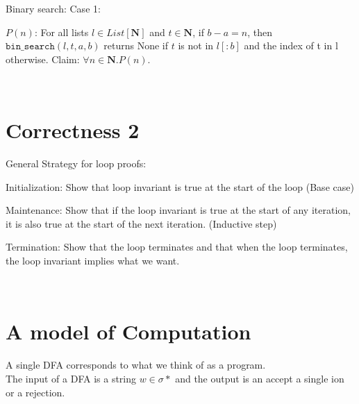 \documentclass{article}
\begin{document}
Binary search: Case 1: 

$P(n)$: For all lists $l \in List[\mathbf{N}]$ and $t \in \mathbf{N}$, if $b - a = n$, then $\texttt{bin_search}(l, t, a, b)$ returns None if $t$ is not in $l[:b]$ and the index of t in l otherwise. Claim: $\forall n \in \mathbf{N}. P(n)$.

\\

\section{Correctness 2}

General Strategy for loop proofs:
\begin{list}
    \item Initialization: Show that loop invariant is true at the start of the loop (Base case)
    \item Maintenance: Show that if the loop invariant is true at the start of any iteration, it is also true at the start of the next iteration. (Inductive step)
    \item Termination: Show that the loop terminates and that when the loop terminates, the loop invariant implies what we want.
\end{list}
\\

\section{A model of Computation}
A single DFA corresponds to what we think of as a program.\\
The input of a DFA is a string $w \in \sigma*$ and the output is an accept a single ion or a rejection.
\end{document}
